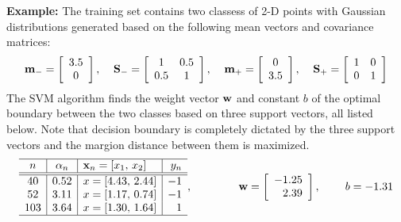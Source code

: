 \documentclass{article}
\begin{document}
{\bf Example: } The training set contains two classess of 2-D points 
with Gaussian distributions generated based on the following mean vectors 
and covariance matrices:
\begin{equation}
  {\bf m}_-=\left[\begin{array}{c}3.5\\0\end{array}\right],\;\;\;\;
  {\bf S}_-=\left[\begin{array}{cc}1&0.5\\0.5&1\end{array}\right],\;\;\;\;
  {\bf m}_+=\left[\begin{array}{c}0\\3.5\end{array}\right],\;\;\;\;
  {\bf S}_+=\left[\begin{array}{cc}1&0\\0&1\end{array}\right]
\end{equation}
The SVM algorithm finds the weight vector ${\bf w}$ and constant $b$ 
of the optimal boundary between the two classes based on three support 
vectors, all listed below. Note that decision boundary is completely 
dictated by the three support vectors and the margion distance between
them is maximized. 
\begin{equation}
  \begin{array}{c|c|l|r}\hline
    n & \alpha_n & {\bf x}_n=[x_1,\,x_2] & y_n \\\hline\hline
    40 &  0.52 & x=[4.43,\, 2.44]  &	-1 \\
    52 &  3.11 & x=[1.17,\, 0.74]  &	-1 \\
    103 &  3.64 & x=[1.30,\, 1.64]  &	 1 \\\hline
  \end{array},\;\;\;\;\;\;\;\;\;\;\;\;\;\;\;
  {\bf w}=\left[\begin{array}{r}-1.25\\2.39\end{array}\right],\;\;\;\;\;\;\;\;
  b=-1.31
\end{equation}
\end{document}
